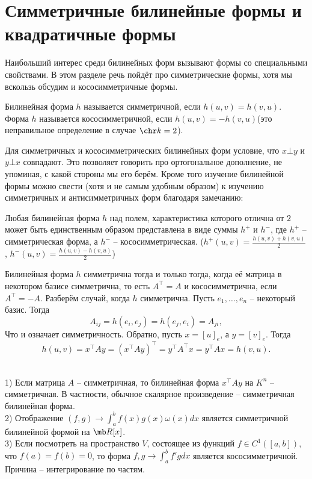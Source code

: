 \section{Симметричные билинейные формы и квадратичные формы}
Наибольший интерес среди билинейных форм вызывают формы со специальными свойствами. В этом разделе речь пойдёт про симметрические формы, хотя мы вскользь обсудим и кососимметричные формы. 



\dfn Билинейная форма $h$ называется симметричной, если $h(u,v)=h(v,u)$. Форма $h$ называется кососимметричной, если $h(u,v)=-h(v,u)$(это неправильное определение в случае $\chr k=2$).
\edfn

Для симметричных и кососимметрических билинейных форм условие, что $x\bot y$ и $y\bot x$ совпадают. Это позволяет говорить про ортогональное дополнение, не упоминая, с какой стороны мы его берём. Кроме того изучение билинейной формы можно свести (хотя и не самым удобным образом) к изучению симметричных и антисимметричных форм благодаря замечанию:

\rm Любая билинейная форма $h$  над полем, характеристика которого отлична от $2$ может быть единственным образом представлена в виде суммы $h^+$ и $h^-$, где $h^+$ -- симметрическая форма, а $h^-$ -- кососимметрическая. ($h^+(u,v)=\frac{h(u,v)+h(v,u)}{2}$, $h^-(u,v)=\frac{h(u,v)-h(v,u)}{2}$)
\erm

\lm  Билинейная форма $h$ симметрична тогда и только тогда, когда её матрица в некотором базисе симметрична, то есть $A^{\top}=A$ и кососимметрична, если $A^{\top}=-A$.
\elm
\proof Разберём случай, когда $h$ симметрична. Пусть $e_1,\dots,e_n$ -- некоторый базис. Тогда $$A_{ij}=h(e_i,e_j)=h(e_j,e_i)=A_{ji},$$
Что и означает симметричность. Обратно, пусть $x=[u]_e$, а $y=[v]_e$. Тогда $$h(u,v)=x^{\top}Ay=(x^\top A y)^{\top}=y^{\top}A^{\top} x=y^\top Ax=h(v,u).$$
\endproof

\exm\\
1) Если матрица $A$ -- симметричная, то билинейная форма $x^{\top}Ay$ на $K^n$ -- симметричная. В частности, обычное скалярное произведение -- симметричная билинейная форма.\\
2) Отображение $(f,g) \to \int_a^b f(x)g(x)\omega(x)dx$ является симметричной билинейной формой на $\mb R[x]$.\\
3) Если посмотреть на пространство $V$, состоящее из функций $f\in C^1([a,b])$, что $f(a)=f(b)=0$, то форма $f,g \to \int_a^b f'g dx$ является кососимметричной. Причина -- интегрирование по частям.\\


